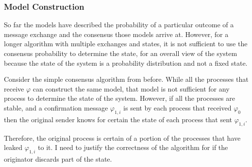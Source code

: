 \documentclass[12pt,oneside]{article}
\begin{document}
\subsubsection{Model Construction}

So far the models have described the probability of a particular outcome of a message exchange and the consensus those models arrive at. However, for a longer algorithm with multiple exchanges and states, it is not sufficient to use the consensus probability to determine the state, for an overall view of the system because the state of the system is a probability distribution and not a fixed state.

Consider the simple consensus algorithm from before. While all the processes that receive $\varphi$ can construct the same model, that model is not sufficient for any process to determine the state of the system. However, if all the processes are stable, and a confirmation message $\varphi_{1,i}$ is sent by each process that received $\varphi_0$ then the original sender knows for certain the state of each process that sent $\varphi_{1,i}$. 

Therefore, the original process is certain of a portion of the processes that have leaked $\varphi_{1,i}$ to it.  I need to justify the correctness of the algorithm for if the originator discards part of the state.


\end{document}
